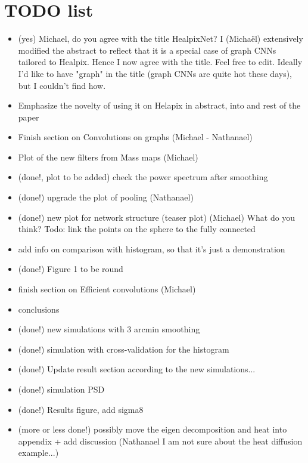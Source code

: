 \documentclass[final,twocolumn,3p,times,authoryear]{elsarticle}
\newcommand{\1}{\b{1}}              %
\newcommand{\0}{\b{0}}              %
\begin{document}

\section{TODO list}
\begin{itemize}[noitemsep,topsep=0pt,parsep=0pt,partopsep=0pt]
	\item (yes) Michael, do you agree with the title HealpixNet? I (Michaël) extensively modified the abstract to reflect that it is a special case of graph CNNs tailored to Healpix. Hence I now agree with the title. Feel free to edit. Ideally I'd like to have "graph" in the title (graph CNNs are quite hot these days), but I couldn't find how.
    \item Emphasize the novelty of using it on Helapix in abstract, into and rest of the paper
    \item Finish section on Convolutions on graphs (Michael - Nathanael)
    \item Plot of the new filters from Mass maps (Michael)
    \item (done!, plot to be added) check the power spectrum after smoothing
    \item (done!) upgrade the plot of pooling (Nathanael)
	\item (done!) new plot for network structure (teaser plot) (Michael) What do you think? Todo: link the points on the sphere to the fully connected
    \item add info on comparison with histogram, so that it's just a demonstration
    \item (done!) Figure 1 to be round
    \item finish section on Efficient convolutions (Michael)
    \item conclusions
    \item (done!) new simulations with 3 arcmin smoothing
    \item (done!) simulation with cross-validation for the histogram
    \item (done!) Update result section according to the new simulations...
    \item (done!) simulation PSD
    \item (done!) Results figure, add sigma8
    \item (more or less done!) possibly move the eigen decomposition and heat into appendix + add discussion (Nathanael I am not sure about the heat diffusion example...)
\end{itemize}
\end{document}
